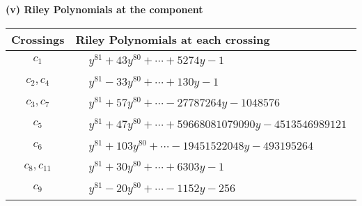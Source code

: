 \documentclass[1p]{elsarticle_modified}
\theoremstyle{definition}
\begin{document}
\newpage\renewcommand{\arraystretch}{1}
\flushleft \textbf{(v) Riley Polynomials at the component}\newline \\
\begin{tabular}{m{50pt}|m{274pt}}
Crossings & \hspace{64pt}Riley Polynomials at each crossing \\
\hline $$\begin{aligned}c_{1}\end{aligned}$$&$\begin{aligned}
&y^{81}+43 y^{80}+\cdots+5274 y-1
\end{aligned}$\\
\hline $$\begin{aligned}c_{2},c_{4}\end{aligned}$$&$\begin{aligned}
&y^{81}-33 y^{80}+\cdots+130 y-1
\end{aligned}$\\
\hline $$\begin{aligned}c_{3},c_{7}\end{aligned}$$&$\begin{aligned}
&y^{81}+57 y^{80}+\cdots-27787264 y-1048576
\end{aligned}$\\
\hline $$\begin{aligned}c_{5}\end{aligned}$$&$\begin{aligned}
&y^{81}+47 y^{80}+\cdots+59668081079090 y-4513546989121
\end{aligned}$\\
\hline $$\begin{aligned}c_{6}\end{aligned}$$&$\begin{aligned}
&y^{81}+103 y^{80}+\cdots-19451522048 y-493195264
\end{aligned}$\\
\hline $$\begin{aligned}c_{8},c_{11}\end{aligned}$$&$\begin{aligned}
&y^{81}+30 y^{80}+\cdots+6303 y-1
\end{aligned}$\\
\hline $$\begin{aligned}c_{9}\end{aligned}$$&$\begin{aligned}
&y^{81}-20 y^{80}+\cdots-1152 y-256
\end{aligned}$\\

\end{tabular}
\end{document}

